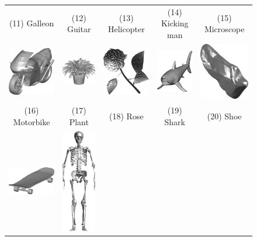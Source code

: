 \begin{figure}[ht!]
\begin{tabular}{ccccc}
	(11) Galleon & (12) Guitar & (13) Helicopter & (14) Kicking man & (15) Microscope \\
	\includegraphics[width=0.13\linewidth]{./fig/eval/16motorbike.png} \hspace{0mm} &
	\includegraphics[width=0.15\linewidth]{./fig/eval/17plant.png} \hspace{0mm} &
	\includegraphics[width=0.15\linewidth]{./fig/eval/18rose.png} \hspace{0mm} &
	\includegraphics[width=0.13\linewidth]{./fig/eval/19shark.png} \hspace{0mm} & 
	\includegraphics[width=0.13\linewidth]{./fig/eval/20shoe.png} \hspace{0mm} \\
	(16) Motorbike & (17) Plant & (18) Rose & (19) Shark & (20) Shoe \\
	\includegraphics[width=0.15\linewidth]{./fig/eval/21skateboard.png} \hspace{0mm} & 
	\includegraphics[width=0.04\linewidth]{./fig/eval/22skeleton.png} \hspace{0mm} &

\end{tabular}
\end{figure}
